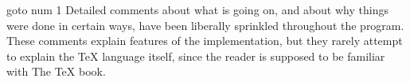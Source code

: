    goto                 %
         num 1          %
\setcolor\cmykSeaGreen  %
Detailed comments about what is going on, and about why things were done in
certain ways, have been liberally sprinkled throughout the program.  These
comments explain features of the implementation, but they rarely attempt to
explain the
\pdfendlink             %
\setcolor\cmykBlack     %
TeX language itself, since the reader is supposed to be familiar with
The TeX book.\par
\pdfendthread           %


